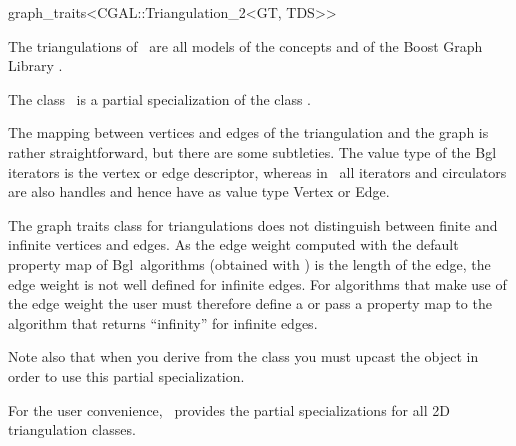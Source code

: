 

\begin{ccRefClass}{graph_traits<CGAL::Triangulation_2<GT, TDS>>}

\ccDefinition
  
The triangulations of \cgal\ are all models of the concepts  and 
  of the Boost Graph Library \cite{cgal:sll-bgl-02}.

The class \ccRefName\ is a partial specialization of the class 
{}.


The mapping between vertices and edges of the triangulation and the
graph is rather straightforward, but there are some subtleties. The
value type of the {\sc Bgl} iterators is the vertex or edge descriptor,
whereas in \cgal\ all iterators and circulators are also handles and
hence have as value type Vertex or Edge.

The graph traits class for triangulations does not distinguish between
finite and infinite vertices and edges. As the edge weight computed
with the default property map of {\sc Bgl}\ algorithms (obtained with
) is the length of the edge, 
the edge weight is not well defined for infinite edges. For algorithms 
that make use of the edge weight the user must therefore
define a 
{} or pass a property map to the
algorithm that returns ``infinity'' for infinite edges. 


Note also that when you derive from the class 
you must upcast the object in order to use this partial specialization.

For the user convenience, \cgal\ provides the partial specializations
for all 2D triangulation classes.






\ccTypes




\end{ccRefClass}
